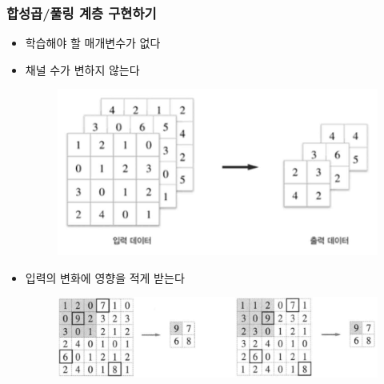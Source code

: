 \documentclass{beamer}
\begin{document}
\begin{frame}
	\frametitle{합성곱/풀링 계층 구현하기}
		\begin{itemize}
			\item 학습해야 할 매개변수가 없다
			\item 채널 수가 변하지 않는다
			\begin{figure}
				\includegraphics[width=0.5\columnwidth]{../Figure/Figure_11.pdf}
			\end{figure}
			\item 입력의 변화에 영향을 적게 받는다
			\begin{figure}
				\includegraphics[width=0.5\columnwidth]{../Figure/Figure_12.pdf}
			\end{figure}
		\end{itemize}
\end{frame}

\end{document}
